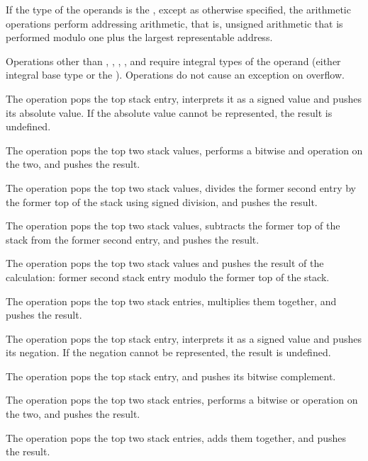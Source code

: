 If the type of the operands is the \generictype, 
except as otherwise specified, the arithmetic operations
perform addressing arithmetic, that is, unsigned arithmetic that is performed
modulo one plus the largest representable address. 

Operations other than \DWOPabs{},
\DWOPdiv{}, \DWOPminus{}, \DWOPmul{}, \DWOPneg{} and \DWOPplus{} 
require integral types of the operand (either integral base type 
or the \generictype).  Operations do not cause an exception 
on overflow.

\begin{enumerate}[1. ]
\itembfnl{\DWOPabsTARG}
The \DWOPabsNAME{} operation pops the top stack entry, interprets
it as a signed value and pushes its absolute value. If the
absolute value cannot be represented, the result is undefined.

\itembfnl{\DWOPandTARG}
The \DWOPandNAME{} operation pops the top two stack values, performs
a bitwise and operation on the two, and pushes the result.

\itembfnl{\DWOPdivTARG}
The \DWOPdivNAME{} operation pops the top two stack values, divides the former second entry by
the former top of the stack using signed division, and pushes the result.

\itembfnl{\DWOPminusTARG}
The \DWOPminusNAME{} operation pops the top two stack values, subtracts the former top of the
stack from the former second entry, and pushes the result.

\itembfnl{\DWOPmodTARG}
The \DWOPmodNAME{} operation pops the top two stack values and pushes the result of the
calculation: former second stack entry modulo the former top of the stack.

\itembfnl{\DWOPmulTARG}
The \DWOPmulNAME{} operation pops the top two stack entries, multiplies them together, and
pushes the result.

\itembfnl{\DWOPnegTARG}
The \DWOPnegNAME{} operation pops the top stack entry, interprets
it as a signed value and pushes its negation. If the negation
cannot be represented, the result is undefined.

\itembfnl{\DWOPnotTARG}
The \DWOPnotNAME{} operation pops the top stack entry, and pushes
its bitwise complement.

\itembfnl{\DWOPorTARG}
The \DWOPorNAME{} operation pops the top two stack entries, performs
a bitwise or operation on the two, and pushes the result.

\itembfnl{\DWOPplusTARG}
The \DWOPplusNAME{} operation pops the top two stack entries,
adds them together, and pushes the result.


\end{enumerate}
